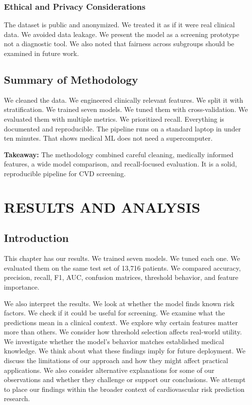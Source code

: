\documentclass[12pt, a4paper, oneside]{book}
\begin{document}
\subsection{Ethical and Privacy Considerations}
The dataset is public and anonymized. We treated it as if it were real clinical data. We avoided data leakage. We present the model as a screening prototype not a diagnostic tool. We also noted that fairness across subgroups should be examined in future work.

\section{Summary of Methodology}
We cleaned the data. We engineered clinically relevant features. We split it with stratification. We trained seven models. We tuned them with cross-validation. We evaluated them with multiple metrics. We prioritized recall. Everything is documented and reproducible. The pipeline runs on a standard laptop in under ten minutes. That shows medical ML does not need a supercomputer.

\begin{takeaway}
\textbf{Takeaway:} The methodology combined careful cleaning, medically informed features, a wide model comparison, and recall-focused evaluation. It is a solid, reproducible pipeline for CVD screening.
\end{takeaway}

\chapter{RESULTS AND ANALYSIS}

\section{Introduction}
This chapter has our results. We trained seven models. We tuned each one. We evaluated them on the same test set of 13,716 patients. We compared accuracy, precision, recall, F1, AUC, confusion matrices, threshold behavior, and feature importance.

We also interpret the results. We look at whether the model finds known risk factors. We check if it could be useful for screening. We examine what the predictions mean in a clinical context. We explore why certain features matter more than others. We consider how threshold selection affects real-world utility. We investigate whether the model's behavior matches established medical knowledge. We think about what these findings imply for future deployment. We discuss the limitations of our approach and how they might affect practical applications. We also consider alternative explanations for some of our observations and whether they challenge or support our conclusions. We attempt to place our findings within the broader context of cardiovascular risk prediction research.
\end{document}
